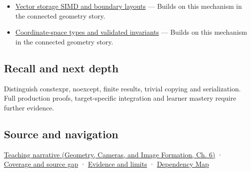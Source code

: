 \begin{itemize}
\tightlist
\item
  \hyperref[appendix-26bf6bf2fb8b]{Vector storage SIMD and boundary layouts} --- Builds on this mechanism in the connected geometry story.
\item
  \hyperref[appendix-380a220e2529]{Coordinate-space types and validated invariants} --- Builds on this mechanism in the connected geometry story.
\end{itemize}

\subsection{Recall and next depth}\label{appendix-37a39984ba66-recall-and-next-depth}

Distinguish constexpr, noexcept, finite results, trivial copying and serialization. Full production proofs, target-specific integration and learner mastery require further evidence.

\subsection{Source and navigation}\label{appendix-37a39984ba66-source-and-navigation}

\href{../03-Geometry-Cameras-and-Image-Formation/main.pdf\#nameddest=02-foundations-ii-ch037-three-stored-numbers-are-not-the-complete-contract}{Teaching narrative (Geometry, Cameras, and Image Formation, Ch. 6)} · \hyperref[appendix-fd090d982a15-phase-6---parts-501-600]{Coverage and source gap} · \hyperref[appendix-a103e7846d21-phase-6---source-analysis-and-verification]{Evidence and limits} · \hyperref[appendix-4ad47bdd269a]{Dependency Map}

